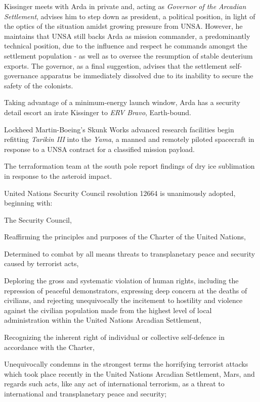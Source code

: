 Kissinger meets with Arda in private and, acting as {\it Governor of the Arcadian Settlement}, advises him to step down as president, a political position, in light of the optics of the situation amidst growing pressure from UNSA. However, he maintains that UNSA still backs Arda as mission commander, a predominantly technical position, due to the influence and respect he commands amongst the settlement population - as well as to oversee the resumption of stable deuterium exports. The governor, as a final suggestion, advises that the settlement self-governance apparatus be immediately dissolved due to its inability to secure the safety of the colonists.
\StopTimelineDate

Taking advantage of a minimum-energy launch window, Arda has a security detail escort an irate Kissinger to {\it ERV Bravo}, Earth-bound.
\StopTimelineDate

Lockheed Martin-Boeing's Skunk Works advanced research facilities begin refitting {\it Tarikin III} into the {\it Yama}, a manned and remotely piloted spacecraft in response to a UNSA contract for a classified mission payload.
\StopTimelineDate

The terraformation team at the south pole report findings of dry ice sublimation in response to the asteroid impact.
\StopTimelineDate

United Nations Security Council resolution 12664 is unanimously adopted, beginning with:

\startTimelineDocument
The Security Council,

Reaffirming the principles and purposes of the Charter of the United Nations,

Determined to combat by all means threats to transplanetary peace and security caused by terrorist acts,

Deploring the gross and systematic violation of human rights, including the repression of peaceful demonstrators, expressing deep concern at the deaths of civilians, and rejecting unequivocally the incitement to hostility and violence against the civilian population made from the highest level of local administration within the United Nations Arcadian Settlement,

Recognizing the inherent right of individual or collective self-defence in accordance with the Charter,

\startitemize[n]
\setupwhitespace[big]
\item Unequivocally condemns in the strongest terms the horrifying terrorist attacks which took place recently in the United Nations Arcadian Settlement, Mars, and regards such acts, like any act of international terrorism, as a threat to international and transplanetary peace and security;

